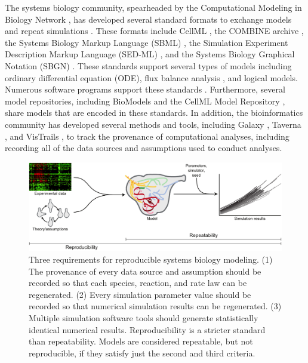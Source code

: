 \documentclass[journal,transmag,twoside]{IEEEtran}
\begin{document}
The systems biology community, spearheaded by the Computational Modeling in Biology Network \cite{hucka2015promoting}, has developed several standard formats to exchange models and repeat simulations \cite{drager2014improving}. These formats include CellML \cite{cuellar2003overview}, the COMBINE archive \cite{COMBINE2012}, the Systems Biology Markup Language (SBML) \cite{hucka2003}, the Simulation Experiment Description Markup Language (SED-ML) \cite{sedml2011}, and the Systems Biology Graphical Notation (SBGN) \cite{LeNovereHMMSS09}. These standards support several types of models including ordinary differential equation (ODE), flux balance analysis \cite{orth2010flux}, and logical models. Numerous software programs support these standards \cite{hucka2011profile}. Furthermore, several model repositories, including BioModels \cite{chelliah2015biomodels} and the CellML Model Repository \cite{lloyd2008cellml}, share models that are encoded in these standards. In addition, the bioinformatics community has developed several methods and tools, including Galaxy \cite{hillman2012using}, Taverna \cite{oinn2004taverna}, and VisTrails \cite{callahan2006vistrails}, to track the provenance of computational analyses, including recording all of the data sources and assumptions used to conduct analyses.

\begin{figure}[!tb]
\centering
\includegraphics[width=\textwidth]{figure1/figure1}
\caption{Three requirements for reproducible systems biology modeling. (1) The provenance of every data source and assumption should be recorded so that each species, reaction, and rate law can be regenerated. (2) Every simulation parameter value should be recorded so that numerical simulation results can be regenerated. (3) Multiple simulation software tools should generate statistically identical numerical results. Reproducibility is a stricter standard than repeatability. Models are considered repeatable, but not reproducible, if they satisfy just the second and third criteria.}
\label{fig_repro_diagram}
\end{figure}
\end{document}
